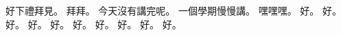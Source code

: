 \hypertarget{w01:cue:4192}{}好下禮拜見。
\hypertarget{w01:cue:4193}{}拜拜。
\hypertarget{w01:cue:4194}{}今天沒有講完呢。
\hypertarget{w01:cue:4195}{}一個學期慢慢講。
\hypertarget{w01:cue:4196}{}嘿嘿嘿。
\hypertarget{w01:cue:4197}{}好。
\hypertarget{w01:cue:4198}{}好。
\hypertarget{w01:cue:4199}{}好。
\hypertarget{w01:cue:4200}{}好。
\hypertarget{w01:cue:4201}{}好。
\hypertarget{w01:cue:4202}{}好。
\hypertarget{w01:cue:4203}{}好。
\hypertarget{w01:cue:4204}{}好。
\hypertarget{w01:cue:4205}{}好。
\hypertarget{w01:cue:4206}{}好。
